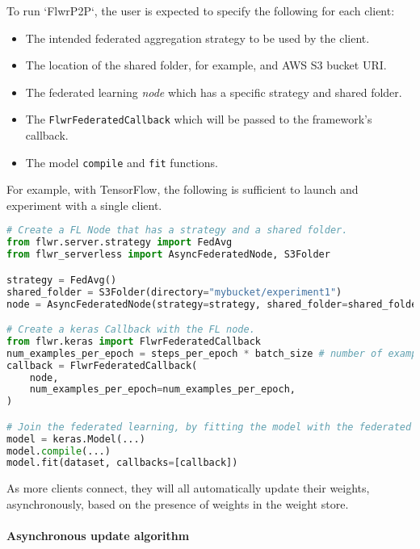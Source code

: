\documentclass[twocolumn, switch]{article} %
\begin{document}
To run `FlwrP2P`, the user is expected to specify the following for each client:

\begin{itemize}
    \item The intended federated aggregation strategy to be used by the client.
    \item The location of the shared folder, for example, and AWS S3 bucket URI.
    \item The federated learning \textit{node} which has a specific strategy and shared folder.
    \item The \texttt{FlwrFederatedCallback} which will be passed to the framework's callback.
    \item The model \texttt{compile} and \texttt{fit} functions.
\end{itemize}

For example, with TensorFlow, the following is sufficient to launch and experiment with a single client. 

\begin{lstlisting}[language=Python]
# Create a FL Node that has a strategy and a shared folder.
from flwr.server.strategy import FedAvg
from flwr_serverless import AsyncFederatedNode, S3Folder

strategy = FedAvg()
shared_folder = S3Folder(directory="mybucket/experiment1")
node = AsyncFederatedNode(strategy=strategy, shared_folder=shared_folder)

# Create a keras Callback with the FL node.
from flwr.keras import FlwrFederatedCallback
num_examples_per_epoch = steps_per_epoch * batch_size # number of examples used in each epoch
callback = FlwrFederatedCallback(
    node,
    num_examples_per_epoch=num_examples_per_epoch,
)

# Join the federated learning, by fitting the model with the federated callback.
model = keras.Model(...)
model.compile(...)
model.fit(dataset, callbacks=[callback])
\end{lstlisting}

As more clients connect, they will all automatically update their weights, asynchronously, based on the presence of weights in the weight store.

\paragraph{Asynchronous update algorithm}
\end{document}
